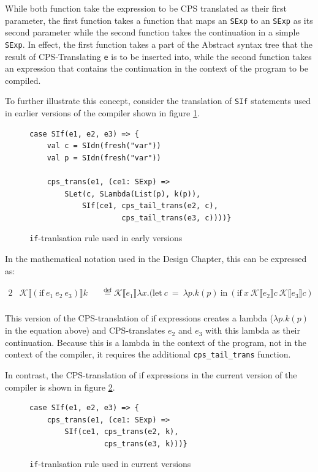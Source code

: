 \documentclass[11pt]{report}
\newcommand{\eqdef}{\stackrel{\text{def}}{=}}%
\newcommand{\cpstrans}[1]{\ensuremath{\mathcal{K}\llbracket #1 \rrbracket}}
\begin{document}
While both function take the expression to be CPS translated as their first parameter, the first function takes a function that maps an \texttt{SExp} to an \texttt{SExp} as its second parameter while the second function takes the continuation in a simple \texttt{SExp}. In effect, the first function takes a part of the Abstract syntax tree that the result of CPS-Translating \texttt{e} is to be inserted into, while the second function takes an expression that contains the continuation in the context of the program to be compiled.

To further illustrate this concept, consider the translation of \texttt{SIf} statements used in earlier versions of the compiler shown in figure \ref{ifcpstrans}.

\begin{figure}[ht]
\begin{lstlisting}
case SIf(e1, e2, e3) => {
    val c = SIdn(fresh("var"))
    val p = SIdn(fresh("var"))
    
    cps_trans(e1, (ce1: SExp) =>
        SLet(c, SLambda(List(p), k(p)),
            SIf(ce1, cps_tail_trans(e2, c), 
                     cps_tail_trans(e3, c))))}
\end{lstlisting}
\caption{\texttt{if}-tranlsation rule used in early versions}
\label{ifcpstrans}
\end{figure}

In the mathematical notation used in the Design Chapter, this can be expressed as:

\begin{alignat*}{2}
&\cpstrans{(\text{if}\ e_1\ e_2\ e_3)} k &&\eqdef \cpstrans{e_1} \lambda x.(\text{let}~c~=~\lambda p.k(p)~\text{in}~(\text{if}\ x\ \cpstrans{e_2}c\ \cpstrans{e_3}c) \\
\end{alignat*}

This version of the CPS-translation of if expressions creates a lambda ($\lambda p.k(p)$ in the equation above) and CPS-translates $e_2$ and $e_3$ with this lambda as their continuation. Because this is a lambda in the context of the program, not in the context of the compiler, it requires the additional \texttt{cps_tail_trans} function.

In contrast, the CPS-translation of if expressions in the current version of the compiler is shown in figure \ref{ifcpstranscurrent}.

\begin{figure}[ht]
\begin{lstlisting}
case SIf(e1, e2, e3) => {
    cps_trans(e1, (ce1: SExp) => 
        SIf(ce1, cps_trans(e2, k), 
                 cps_trans(e3, k)))}
\end{lstlisting}
\caption{\texttt{if}-tranlsation rule used in current versions}
\label{ifcpstranscurrent}
\end{figure}
\end{document}
